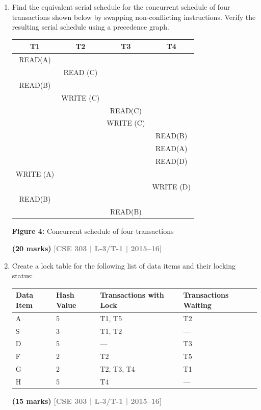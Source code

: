 \documentclass[12pt,a3paper]{article}
\newcommand{\yr}[1]{\hfill\textcolor{gray}{\small\textbf{[#1]}}}
\newcommand{\mk}[1]{\textcolor{orange!70!black}{\small\textbf{(#1 marks)}}}
\begin{document}
\begin{enumerate}
\item Find the equivalent serial schedule for the concurrent schedule of four transactions shown below by swapping non-conflicting instructions. Verify the resulting serial schedule using a precedence graph.

\medskip
\begin{center}
\renewcommand{\arraystretch}{1.3} %
    \begin{tabular}{|c|c|c|c|}
        \hline
        \textbf{T1} & \textbf{T2} & \textbf{T3} & \textbf{T4} \\
        \hline
        READ(A) & & & \\
        \hline
        & READ (C) & & \\
        \hline
        READ(B) & & & \\
        \hline
        & WRITE (C) & & \\
        \hline
        & & READ(C) & \\
        \hline
        & & WRITE (C) & \\
        \hline
        & & & READ(B) \\
        \hline
        & & & READ(A) \\
        \hline
        & & & READ(D) \\
        \hline
        WRITE (A) & & & \\
        \hline
        & & & WRITE (D) \\
        \hline
        READ(B) & & & \\
        \hline
        & & READ(B) & \\
        \hline
    \end{tabular}
    
    \vspace{0.4cm}
    \textbf{Figure 4:} Concurrent schedule of four transactions
\end{center}
\mk{20} \yr{CSE 303 | L-3/T-1 | 2015--16}

\item Create a lock table for the following list of data items and their locking status:

\medskip
\begin{center}
\small
\begin{tabular}{llll}
\toprule
\textbf{Data Item} & \textbf{Hash Value} & \textbf{Transactions with Lock} & \textbf{Transactions Waiting}\\
\midrule
A & 5 & T1, T5 & T2\\
S & 3 & T1, T2 & ---\\
D & 5 & --- & T3\\
F & 2 & T2 & T5\\
G & 2 & T2, T3, T4 & T1\\
H & 5 & T4 & ---\\
\bottomrule
\end{tabular}
\end{center}
\mk{15} \yr{CSE 303 | L-3/T-1 | 2015--16}


\end{enumerate}
\end{document}
